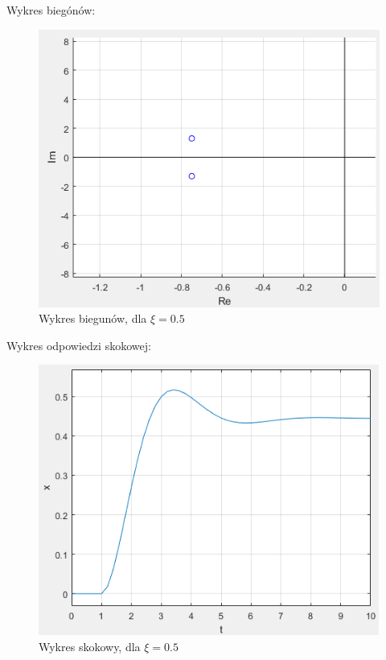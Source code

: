 \documentclass{article}
\begin{document}
\begin{flushleft}
 
  Wykres biegónów:\\
 \begin{figure}[h!]
    \centering
    \includegraphics[scale=0.6]{biegunyksi05.png}
    \caption{Wykres biegunów, dla $\xi=0.5$}
    \label{fig:bieguny_ksi_0_5}
 \end{figure}
 
 
 Wykres odpowiedzi skokowej:\\
 \begin{figure}[h!]
    \centering
    \includegraphics[scale=0.6]{skokksi05.png}
    \caption{Wykres skokowy, dla $\xi=0.5$}
    \label{fig:ksi_0_5}
 \end{figure}
 

\end{flushleft}
\end{document}
